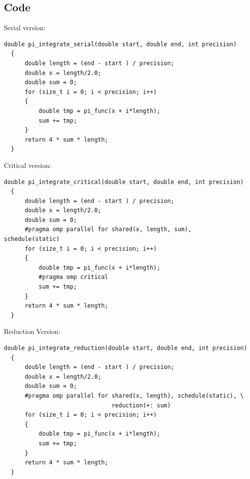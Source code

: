 \documentclass[article]{scrartcl}
\begin{document}
\subsection{Code}
Serial version:
\begin{lstlisting}[frame=single]
  double pi_integrate_serial(double start, double end, int precision)
  {
      double length = (end - start ) / precision;
      double x = length/2.0;
      double sum = 0;
      for (size_t i = 0; i < precision; i++)
      {
          double tmp = pi_func(x + i*length);
          sum += tmp;
      }
      return 4 * sum * length; 
  }
\end{lstlisting}
Critical version:  
\begin{lstlisting}[frame=single]
  double pi_integrate_critical(double start, double end, int precision)
  {
      double length = (end - start ) / precision;
      double x = length/2.0;
      double sum = 0;
      #pragma omp parallel for shared(x, length, sum), schedule(static)
      for (size_t i = 0; i < precision; i++)
      {
          double tmp = pi_func(x + i*length);
          #pragma omp critical
          sum += tmp;
      }
      return 4 * sum * length; 
  }
\end{lstlisting}
Reduction Version:
\begin{lstlisting}[frame=single]
  double pi_integrate_reduction(double start, double end, int precision)
  {
      double length = (end - start ) / precision;
      double x = length/2.0;
      double sum = 0;
      #pragma omp parallel for shared(x, length), schedule(static), \
                               reduction(+: sum)
      for (size_t i = 0; i < precision; i++)
      {
          double tmp = pi_func(x + i*length);
          sum += tmp;
      }
      return 4 * sum * length;
  }
\end{lstlisting}
\end{document}
